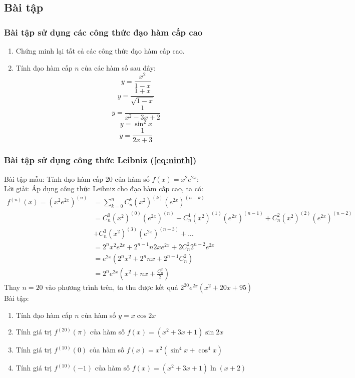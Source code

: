 \subsection{Bài tập}
\subsubsection{Bài tập sử dụng các công thức đạo hàm cấp cao}
\begin{enumerate}
    \item Chứng minh lại tất cả các công thức đạo hàm cấp cao.
    \item Tính đạo hàm cấp $n$ của các hàm số sau đây:
    $$y=\frac{x^2}{1-x}$$
    $$y=\frac{1+x}{\sqrt{1-x}}$$
    $$y=\frac{1}{x^2-3x+2}$$
    $$y=\sin^2{x}$$
    $$y=\frac{1}{2x+3}$$
\end{enumerate}
\subsubsection{Bài tập sử dụng công thức Leibniz (\ref{eq:ninth})}
Bài tập mẫu: Tính đạo hàm cấp $20$ của hàm số $f(x)=x^2e^{2x}$:\\
Lời giải: Áp dụng công thức Leibniz cho đạo hàm cấp cao, ta có:
\begin{equation*}
\begin{split}
f^{(n)}(x)=(x^2e^{2x})^{(n)}&=\sum_{k=0}^{n}C_{n}^k(x^2)^{(k)}(e^{2x})^{(n-k)}\\&=C_{n}^{0}(x^2)^{(0)}(e^{2x})^{(n)}+C_{n}^{1}(x^2)^{(1)}(e^{2x})^{(n-1)}+C_{n}^{2}(x^2)^{(2)}(e^{2x})^{(n-2)}\\&+C_{n}^{3}(x^2)^(3)(e^{2x})^{(n-3)}+...\\&=2^nx^2e^{2x}+2^{n-1}n2xe^{2x}+2C_{n}^{2}2^{n-2}e^{2x}\\&=e^{2x}(2^nx^2+2^nnx+2^{n-1}C_{n}^{2})\\&=2^ne^{2x}\left(x^2+nx+\frac{C_{n}^{2}}{2}\right)
\end{split}
\end{equation*}
Thay $n=20$ vào phương trình trên, ta thu được kết quả $2^{20}e^{2x}(x^2+20x+95)$
Bài tập:
\begin{enumerate}
    \item Tính đạo hàm cấp $n$ của hàm số $y=x\cos{2x}$
    \item Tính giá trị $f^{(20)}(\pi)$ của hàm số $f(x)=(x^2+3x+1)\sin{2x}$
    \item Tính giá trị $f^{(10)}(0)$ của hàm số $f(x)=x^2(\sin^4{x}+\cos^4{x})$
    \item Tính giá trị $f^{(10)}(-1)$ của hàm số $f(x)=(x^2+3x+1)\ln{(x+2)}$
\end{enumerate}
